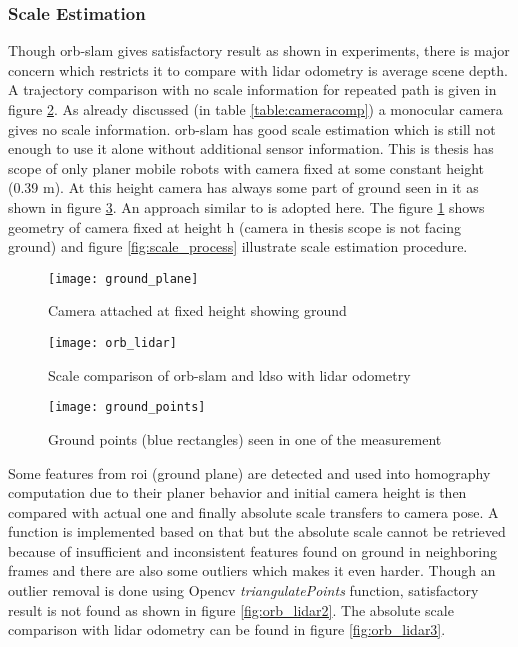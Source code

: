 \subsubsection{Scale Estimation}
Though \acrshort{orb}-\acrshort{slam} gives satisfactory result as shown in experiments, there is major concern which restricts it to compare with \acrshort{lidar} odometry is average scene depth. A trajectory comparison with no scale information for repeated path is given in figure \ref{fig:orb_lidar}. As already discussed (in table \ref{table:cameracomp}) a monocular camera gives no scale information. \acrshort{orb}-\acrshort{slam} has good scale estimation which is still not enough to use it alone without additional sensor information. This is thesis has scope of only planer mobile robots with camera fixed at some constant height (0.39 m). At this height camera has always some part of ground seen in it as shown in figure \ref{fig:ground_points}. An approach similar to \cite{ground} is adopted here. The figure \ref{fig:ground_plane} shows geometry of camera fixed at height h (camera in thesis scope is not facing ground) and figure \ref{fig:scale_process} illustrate scale estimation procedure.\\
\newline
\begin{figure}[H]
	\centering
	\texttt{[image: ground\_plane]}
	\caption{Camera attached at fixed height showing ground \cite{ground}}
	\label{fig:ground_plane}
\end{figure}
\begin{figure}[H]
	\centering
	\texttt{[image: orb\_lidar]}
	\caption{Scale comparison of \acrshort{orb}-\acrshort{slam} and \acrshort{ldso} with \acrshort{lidar} odometry}
	\label{fig:orb_lidar}
\end{figure}
\begin{figure}[H]
	\centering
	\texttt{[image: ground\_points]}
	\caption{Ground points (blue rectangles) seen in one of the measurement}
	\label{fig:ground_points}
\end{figure}
\noindent Some features from \acrshort{roi} (ground plane) are detected and used into homography computation due to their planer behavior and initial camera height is then compared with actual one and finally absolute scale transfers to camera pose. A function is implemented based on that but the absolute scale cannot be retrieved because of insufficient and inconsistent features found on ground in neighboring frames and there are also some outliers which makes it even harder. Though an outlier removal is done using Opencv \textit{triangulatePoints} function, satisfactory result is not found as shown in figure \ref{fig:orb_lidar2}. The absolute scale comparison with \acrshort{lidar} odometry can be found in figure \ref{fig:orb_lidar3}.
